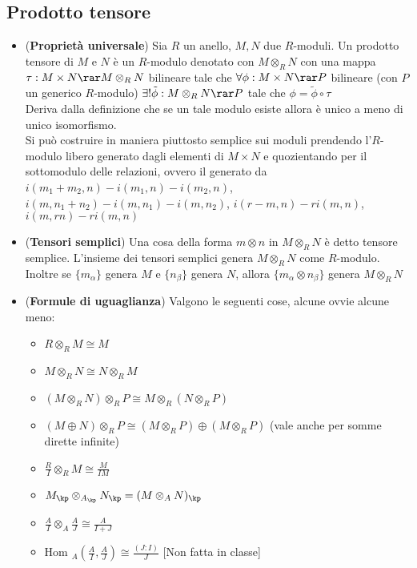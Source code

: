 \documentclass[a4paper,NoNotes,GeneralMath]{stdmdoc}
\newcommand{\Hom}{\text{Hom }}
\begin{document}
	\subsection*{Prodotto tensore}
	\begin{itemize}
		\item ({\bf Proprietà universale}) Sia $R$ un anello, $M, N$ due $R$-moduli. Un prodotto tensore di $M$ e $N$ è un $R$-modulo denotato con $M \otimes_R N$ con una mappa $\tau: M \times N \rar M \otimes_R N$ bilineare tale che $\forall \phi: M \times N \rar P$ bilineare (con $P$ un generico $R$-modulo) $\exists ! \tilde\phi: M \otimes_R N \rar P$ tale che $\phi = \tilde\phi \circ \tau$ \\
		Deriva dalla definizione che se un tale modulo esiste allora è unico a meno di unico isomorfismo. \\
		Si può costruire in maniera piuttosto semplice sui moduli prendendo l'$R$-modulo libero generato dagli elementi di $M \times N$ e quozientando per il sottomodulo delle relazioni, ovvero il generato da $i(m_1+m_2, n) - i(m_1, n) - i(m_2,n)$, $i(m, n_1+n_2) - i(m, n_1) - i(m, n_2)$, $i(r-m, n) - r i(m, n)$, $i(m, rn) - r i (m,n)$
		\item ({\bf Tensori semplici}) Una cosa della forma $m \otimes n$ in $M \otimes_R N$ è detto tensore semplice. L'insieme dei tensori semplici genera $M \otimes_R N$ come $R$-modulo. Inoltre se $\{m_\alpha\}$ genera $M$ e $\{n_\beta\}$ genera $N$, allora $\{m_\alpha \otimes n_\beta\}$ genera $M \otimes_R N$
		\item ({\bf Formule di uguaglianza}) Valgono le seguenti cose, alcune ovvie alcune meno:
			\begin{itemize}
				\item $R \otimes_R M \cong M$
				\item $M \otimes_R N \cong N \otimes_R M$
				\item $(M \otimes_R N) \otimes_R P \cong M \otimes_R (N \otimes_R P)$
				\item $(M \oplus N) \otimes_R P \cong (M \otimes_R P) \oplus (M \otimes_R P)$ (vale anche per somme dirette infinite)
				\item $\frac{R}{I} \otimes_R M \cong \frac{M}{IM}$
				\item $M_\kp \otimes_{A_\kp} N_\kp = (M \otimes_A N)_\kp$
				\item $\frac{A}{I} \otimes_A \frac{A}{J} \cong \frac{A}{I+J}$
				\item $\Hom_A(\frac{A}{I}, \frac{A}{J}) \cong \frac{(J : I)}{J}$ [Non fatta in classe]

\end{itemize}
\end{itemize}
\end{document}
